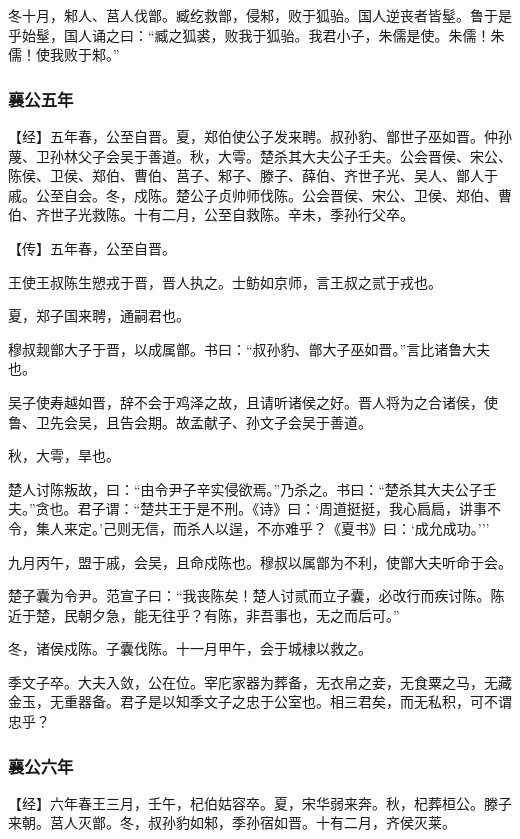 \documentclass[]{article}
\begin{document}
冬十月，邾人、莒人伐鄫。臧纥救鄫，侵邾，败于狐骀。国人逆丧者皆髽。鲁于是乎始髽，国人诵之曰：``臧之狐裘，败我于狐骀。我君小子，朱儒是使。朱儒！朱儒！使我败于邾。''

\hypertarget{header-n1860}{%
\subsubsection{襄公五年}\label{header-n1860}}

【经】五年春，公至自晋。夏，郑伯使公子发来聘。叔孙豹、鄫世子巫如晋。仲孙蔑、卫孙林父子会吴于善道。秋，大雩。楚杀其大夫公子壬夫。公会晋侯、宋公、陈侯、卫侯、郑伯、曹伯、莒子、邾子、滕子、薛伯、齐世子光、吴人、鄫人于戚。公至自会。冬，戍陈。楚公子贞帅师伐陈。公会晋侯、宋公、卫侯、郑伯、曹伯、齐世子光救陈。十有二月，公至自救陈。辛未，季孙行父卒。

【传】五年春，公至自晋。

王使王叔陈生愬戎于晋，晋人执之。士鲂如京师，言王叔之贰于戎也。

夏，郑子国来聘，通嗣君也。

穆叔觌鄫大子于晋，以成属鄫。书曰：``叔孙豹、鄫大子巫如晋。''言比诸鲁大夫也。

吴子使寿越如晋，辞不会于鸡泽之故，且请听诸侯之好。晋人将为之合诸侯，使鲁、卫先会吴，且告会期。故孟献子、孙文子会吴于善道。

秋，大雩，旱也。

楚人讨陈叛故，曰：``由令尹子辛实侵欲焉。''乃杀之。书曰：``楚杀其大夫公子壬夫。''贪也。君子谓：``楚共王于是不刑。《诗》曰：`周道挺挺，我心扃扃，讲事不令，集人来定。'己则无信，而杀人以逞，不亦难乎？《夏书》曰：`成允成功。'''

九月丙午，盟于戚，会吴，且命戍陈也。穆叔以属鄫为不利，使鄫大夫听命于会。

楚子囊为令尹。范宣子曰：``我丧陈矣！楚人讨贰而立子囊，必改行而疾讨陈。陈近于楚，民朝夕急，能无往乎？有陈，非吾事也，无之而后可。''

冬，诸侯戍陈。子囊伐陈。十一月甲午，会于城棣以救之。

季文子卒。大夫入敛，公在位。宰庀家器为葬备，无衣帛之妾，无食粟之马，无藏金玉，无重器备。君子是以知季文子之忠于公室也。相三君矣，而无私积，可不谓忠乎？

\hypertarget{header-n1875}{%
\subsubsection{襄公六年}\label{header-n1875}}

【经】六年春王三月，壬午，杞伯姑容卒。夏，宋华弱来奔。秋，杞葬桓公。滕子来朝。莒人灭鄫。冬，叔孙豹如邾，季孙宿如晋。十有二月，齐侯灭莱。
\end{document}

